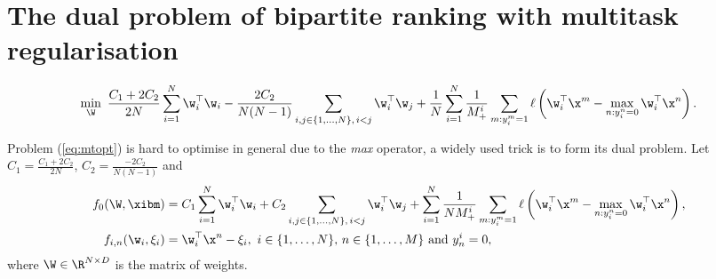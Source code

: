 \section{The dual problem of bipartite ranking with multitask regularisation}

\begin{equation}
\label{eq:mtopt}
\begin{aligned}
\min_{\W} \ \frac{C_1 + 2C_2}{2 N} \sum_{i=1}^{N} \w_i^\top \w_i 
- \frac{2C_2}{N (N - 1)} \sum_{i, j \in \{1,\dots,N\}, \, i < j} \w_i^\top \w_j
+ \frac{1}{N} \sum_{i = 1}^{N} \frac{1}{M_+^i} \sum_{m: y_i^m = 1} \ell \left( \w_i^\top \x^m - \max_{n: y_i^n = 0} \w_i^\top \x^n \right).
\end{aligned}
\end{equation}

Problem (\ref{eq:mtopt}) is hard to optimise in general due to the \emph{max} operator,
a widely used trick is to form its dual problem.
Let $C_1 = \frac{C_1 + 2C_2}{2 N}$, $C_2 = \frac{-2C_2}{N (N - 1)}$ and
\begin{equation*}
\begin{aligned}
f_0(\W, \xibm) &=  C_1 \sum_{i=1}^{N} \w_i^\top \w_i + C_2 \sum_{i, j \in \{1,\dots,N\}, \, i < j} \w_i^\top \w_j
    + \sum_{i = 1}^{N} \frac{1}{N M_+^i} \sum_{m: y_i^m = 1} \ell \left( \w_i^\top \x^m - \max_{n: y_i^n = 0} \w_i^\top \x^n \right), \\
f_{i,n}(\w_i, \xi_i) &= \w_i^\top \x^n - \xi_i, \ i \in \{1,\dots,N\}, \, n \in \{1,\dots,M\} \ \mathrm{and} \ y_n^i = 0,
\end{aligned}
\end{equation*}
where $\W \in \R^{N \times D}$ is the matrix of weights.

